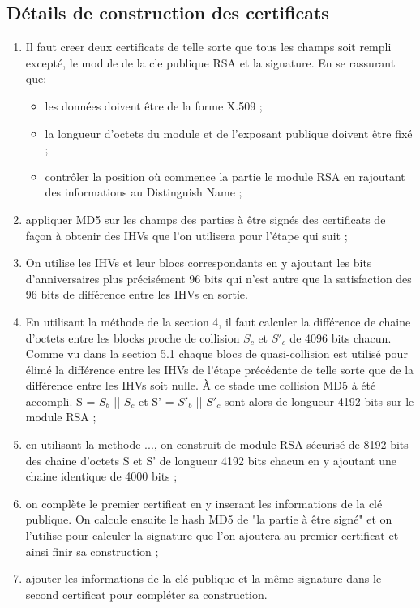 \documentclass[a4paper,11pt,french]{article}
\begin{document}
\subsection{Détails de construction des certificats}
\begin{enumerate}
\item Il faut creer deux certificats de telle sorte que tous les champs soit rempli excepté, le module de la cle publique RSA et la signature. En se rassurant que:
 \begin{itemize} 
 \item les données doivent être de la forme X.509 ;
 \item la longueur d'octets du module et de l'exposant publique doivent être fixé ;
 \item contrôler la position où commence la partie le module RSA en rajoutant des informations au Distinguish Name ;
\end{itemize}
\item appliquer MD5 sur les champs des parties à être signés des certificats de façon à obtenir des IHVs que l'on utilisera pour l'étape qui suit ;
\item On utilise les IHVs et leur blocs correspondants en y ajoutant les bits d'anniversaires plus précisément 96 bits qui n'est autre que la satisfaction des 96 bits de différence entre les IHVs en sortie.
\item En utilisant la méthode de la section 4, il faut calculer la différence de chaine d'octets entre les blocks proche de collision $S_{c}$ et $S'_{c}$ de 4096 bits chacun. Comme vu dans la section 5.1 chaque blocs de quasi-collision est utilisé pour élimé la différence entre les IHVs de l'étape précédente de telle sorte que de la différence entre les IHVs soit nulle. À ce stade une collision MD5 à été accompli. S = $S_{b}$ || $S_{c}$ et S' = $S'_{b}$ || $S'_{c}$ sont alors de longueur 4192 bits sur le module RSA ;
\item en utilisant la methode ..., on construit de module RSA sécurisé de 8192 bits des chaine d'octets S et S' de longueur 4192 bits chacun en y ajoutant une chaine identique de 4000 bits ;
\item on complète le premier certificat en y inserant les informations de la clé publique. On calcule ensuite le hash MD5 de "la partie à être signé" et on l'utilise pour calculer la signature que l'on ajoutera au premier certificat et ainsi finir sa construction ;
\item ajouter les informations de la clé publique et la même signature dans le second certificat pour compléter sa construction.	
\end{enumerate}
\vspace{.5cm}
\end{document}
